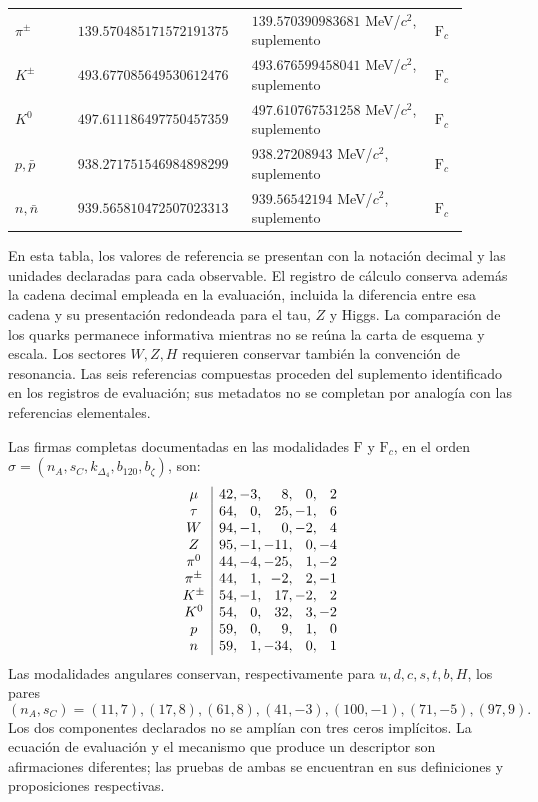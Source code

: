 \begin{longtable}{p{0.13\linewidth}p{0.32\linewidth}p{0.38\linewidth}p{0.07\linewidth}}
\(\pi^\pm\) & \(139.570485171\allowbreak572191375\) & \(139.570390983681\) MeV/\(c^2\), suplemento & \(\mathrm F_c\)\\
\(K^\pm\) & \(493.677085649\allowbreak530612476\) & \(493.676599458041\) MeV/\(c^2\), suplemento & \(\mathrm F_c\)\\
\(K^0\) & \(497.611186497\allowbreak750457359\) & \(497.610767531258\) MeV/\(c^2\), suplemento & \(\mathrm F_c\)\\
\(p,\bar p\) & \(938.271751546\allowbreak984898299\) & \(938.27208943\) MeV/\(c^2\), suplemento & \(\mathrm F_c\)\\
\(n,\bar n\) & \(939.565810472\allowbreak507023313\) & \(939.56542194\) MeV/\(c^2\), suplemento & \(\mathrm F_c\)\\
\end{longtable}
\endgroup

En esta tabla, los valores de referencia se presentan con la notación
decimal y las unidades declaradas para cada observable. El registro de
cálculo conserva además la cadena decimal empleada en la evaluación,
incluida la diferencia entre esa cadena y su presentación redondeada para
el tau, \(Z\) y Higgs. La comparación de los quarks
permanece informativa mientras no se reúna la carta de esquema y escala.
Los sectores \(W,Z,H\) requieren conservar también la convención de
resonancia. Las seis referencias compuestas proceden del suplemento
identificado en los registros de evaluación; sus metadatos no se completan
por analogía con las referencias elementales.

Las firmas completas documentadas en las modalidades \(\mathrm F\) y
\(\mathrm F_c\), en el orden
\(\sigma=(n_A,s_C,k_{\Delta_4},b_{120},b_\zeta)\), son:
\[
\begin{array}{c|r@{,\,}r@{,\,}r@{,\,}r@{,\,}r}
\mu&42&-3&8&0&2\\
\tau&64&0&25&-1&6\\
W&94&-1&0&-2&4\\
Z&95&-1&-11&0&-4\\
\pi^0&44&-4&-25&1&-2\\
\pi^\pm&44&1&-2&2&-1\\
K^\pm&54&-1&17&-2&2\\
K^0&54&0&32&3&-2\\
p&59&0&9&1&0\\
n&59&1&-34&0&1
\end{array}
\]
Las modalidades angulares conservan, respectivamente para
\(u,d,c,s,t,b,H\), los pares
\[
(n_A,s_C)=(11,7),(17,8),(61,8),(41,-3),(100,-1),(71,-5),(97,9).
\]
Los dos componentes declarados no se amplían con
tres ceros implícitos. La ecuación de evaluación y el mecanismo que
produce un descriptor son afirmaciones diferentes; las pruebas de ambas
se encuentran en sus definiciones y proposiciones respectivas.

